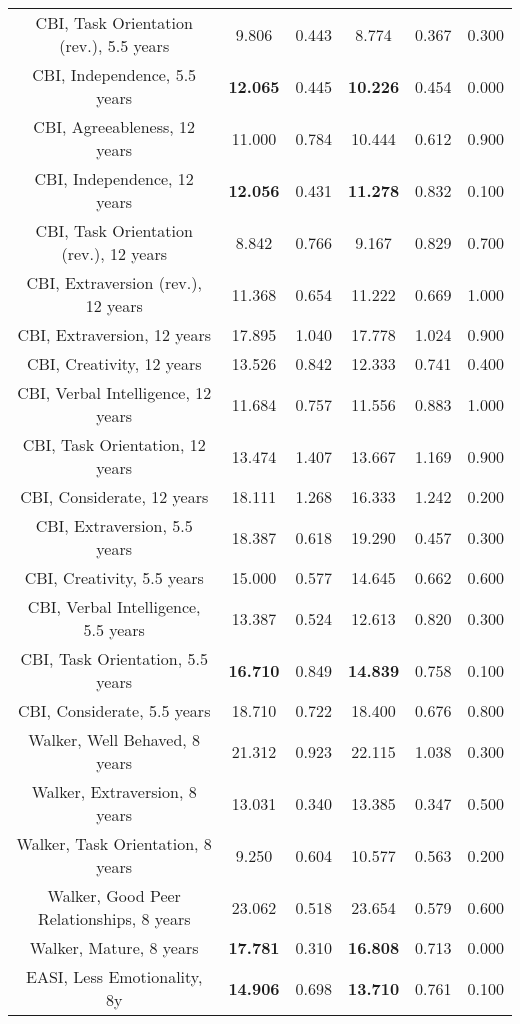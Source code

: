\begin{longtable}{c c c c c c}
CBI, Task Orientation (rev.), 5.5 years & 9.806 & 0.443 &  8.774 & 0.367 & 0.300 \\
CBI, Independence, 5.5 years & \textbf{12.065} & 0.445 &  \textbf{10.226} & 0.454 & 0.000 \\
CBI, Agreeableness, 12 years & 11.000 & 0.784 &  10.444 & 0.612 & 0.900 \\
CBI, Independence, 12 years & \textbf{12.056} & 0.431 &  \textbf{11.278} & 0.832 & 0.100 \\
CBI, Task Orientation (rev.), 12 years & 8.842 & 0.766 &  9.167 & 0.829 & 0.700 \\
CBI, Extraversion (rev.), 12 years & 11.368 & 0.654 &  11.222 & 0.669 & 1.000 \\
CBI, Extraversion, 12 years & 17.895 & 1.040 &  17.778 & 1.024 & 0.900 \\
CBI, Creativity, 12 years & 13.526 & 0.842 &  12.333 & 0.741 & 0.400 \\
CBI, Verbal Intelligence, 12 years & 11.684 & 0.757 &  11.556 & 0.883 & 1.000 \\
CBI, Task Orientation, 12 years & 13.474 & 1.407 &  13.667 & 1.169 & 0.900 \\
CBI, Considerate, 12 years & 18.111 & 1.268 &  16.333 & 1.242 & 0.200 \\
CBI, Extraversion, 5.5 years & 18.387 & 0.618 &  19.290 & 0.457 & 0.300 \\
CBI, Creativity, 5.5 years & 15.000 & 0.577 &  14.645 & 0.662 & 0.600 \\
CBI, Verbal Intelligence, 5.5 years & 13.387 & 0.524 &  12.613 & 0.820 & 0.300 \\
CBI, Task Orientation, 5.5 years & \textbf{16.710} & 0.849 &  \textbf{14.839} & 0.758 & 0.100 \\
CBI, Considerate, 5.5 years & 18.710 & 0.722 &  18.400 & 0.676 & 0.800 \\
Walker, Well Behaved, 8 years & 21.312 & 0.923 &  22.115 & 1.038 & 0.300 \\
Walker, Extraversion, 8 years & 13.031 & 0.340 &  13.385 & 0.347 & 0.500 \\
Walker, Task Orientation, 8 years & 9.250 & 0.604 &  10.577 & 0.563 & 0.200 \\
Walker, Good Peer Relationships, 8 years & 23.062 & 0.518 &  23.654 & 0.579 & 0.600 \\
Walker, Mature, 8 years & \textbf{17.781} & 0.310 &  \textbf{16.808} & 0.713 & 0.000 \\
EASI, Less Emotionality, 8y & \textbf{14.906} & 0.698 &  \textbf{13.710} & 0.761 & 0.100 \\

\end{longtable}
